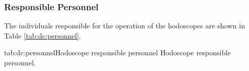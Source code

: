 {\subsubsection{Responsible Personnel}

The individuals responsible for the operation
of the hodoscopes are shown in Table \ref{tab:dc:personnel}.

\begin{namestab}{tab:dc:personnel}{Hodoscope responsible personnel}{%
      Hodoscope responsible personnel.}
  \DaveMack{}
  \MahlonLong{}
  \SimonaMalace{}
\end{namestab}


}%
